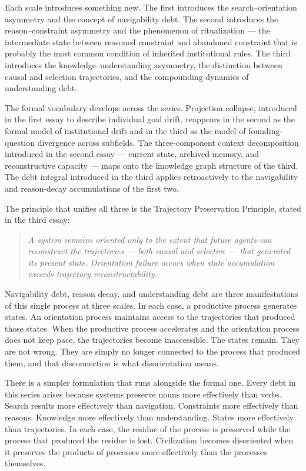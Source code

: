 Each scale introduces something new. The first introduces the search--orientation
asymmetry and the concept of navigability debt. The second introduces the
reason--constraint asymmetry and the phenomenon of ritualization --- the
intermediate state between reasoned constraint and abandoned constraint that
is probably the most common condition of inherited institutional rules. The
third introduces the knowledge--understanding asymmetry, the distinction
between causal and selection trajectories, and the compounding dynamics of
understanding debt.

The formal vocabulary develops across the series. Projection collapse, introduced
in the first essay to describe individual goal drift, reappears in the second
as the formal model of institutional drift and in the third as the model of
founding-question divergence across subfields. The three-component context
decomposition introduced in the second essay --- current state, archived memory,
and reconstructive capacity --- maps onto the knowledge graph structure of the
third. The debt integral introduced in the third applies retroactively to the
navigability and reason-decay accumulations of the first two.

The principle that unifies all three is the Trajectory Preservation Principle,
stated in the third essay:

\begin{quote}
\itshape
A system remains oriented only to the extent that future agents can reconstruct
the trajectories --- both causal and selective --- that generated its present
state. Orientation failure occurs when state accumulation exceeds trajectory
reconstructability.
\end{quote}

Navigability debt, reason decay, and understanding debt are three
manifestations of this single process at three scales. In each case, a
productive process generates states. An orientation process maintains
access to the trajectories that produced those states. When the productive
process accelerates and the orientation process does not keep pace, the
trajectories become inaccessible. The states remain. They are not wrong.
They are simply no longer connected to the process that produced them,
and that disconnection is what disorientation means.

There is a simpler formulation that runs alongside the formal one. Every
debt in this series arises because systems preserve nouns more effectively
than verbs. Search results more effectively than navigation. Constraints
more effectively than reasons. Knowledge more effectively than understanding.
States more effectively than trajectories. In each case, the residue of
the process is preserved while the process that produced the residue is
lost. Civilization becomes disoriented when it preserves the products of
processes more effectively than the processes themselves.

